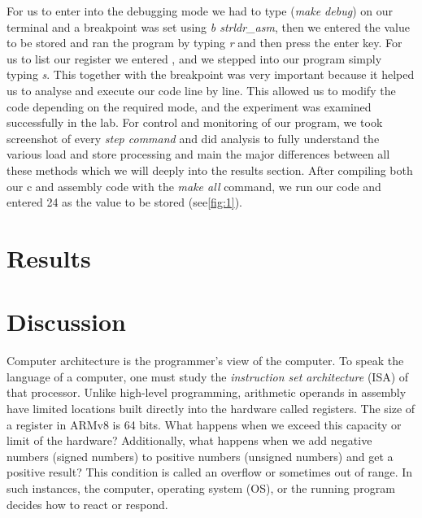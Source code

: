 For us to enter into the debugging mode we had to type (\textit{make debug}) on our terminal and a breakpoint was set using \textit{b strldr\_asm}, then we entered the value to be stored and ran the program by typing \textit{r} and then press the enter key. For us to list our register we entered , and we stepped into our program simply typing \textit{s}. This together with the breakpoint was very important because it helped us to analyse and execute our code line by line. This allowed us to modify the code depending on the required mode, and the experiment was examined successfully in the lab.
For control and monitoring of our program, we took screenshot of every \textit{step command} and did analysis to fully 
understand the various load and store processing and main the major differences between all these methods which we will 
deeply into the results section.
After compiling both our c and assembly code with the \textit{make all} command, we run our code and entered 24 as the value to be stored (see\ref{fig:1}). 

\newpage
\section*{Results}

\newpage
\section*{Discussion}

Computer architecture is the programmer's view of the computer. To speak the language of a computer, one must study the \textit{instruction set architecture} (ISA) of that processor. Unlike high-level programming, arithmetic operands in assembly have limited locations built directly into the hardware called registers. The size of a register in ARMv8 is 64 bits. What happens when we exceed this capacity or limit of the hardware? Additionally, what happens when we add negative numbers (signed numbers) to positive numbers (unsigned numbers) and get a positive result? This condition is called an overflow or sometimes out of range. In such instances, the computer, operating system (OS), or the running program decides how to react or respond.

